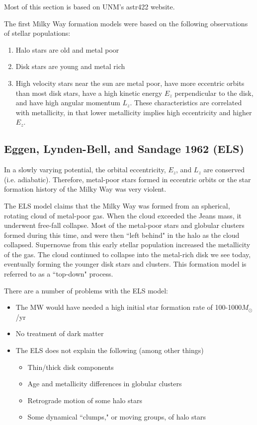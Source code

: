 Most of this section is based on UNM's astr422 website.

The first Milky Way formation models were based on the following observations of stellar populations:

\begin{enumerate}
\item Halo stars are old and metal poor
\item Disk stars are young and metal rich
\item High velocity stars near the sun are metal poor, have more eccentric orbits than most disk stars, have a high kinetic energy $E_z$ perpendicular to the disk, and have high angular momentum $L_z$. These characteristics are correlated with metallicity, in that lower metallicity implies high eccentricity and higher $E_z$. 
\end{enumerate}

\subsection{Eggen, Lynden-Bell, and Sandage 1962 (ELS)}

In a slowly varying potential, the orbital eccentricity, $E_z$, and $L_z$ are conserved (i.e. adiabatic). Therefore, metal-poor stars formed in eccentric orbits or the star formation history of the Milky Way was very violent. 

The ELS model claims that the Milky Way was formed from an spherical, rotating cloud of metal-poor gas. When the cloud exceeded the Jeans mass, it underwent free-fall collapse. Most of the metal-poor stars and globular clusters formed during this time, and were then ``left behind" in the halo as the cloud collapsed. Supernovae from this early stellar population increased the metallicity of the gas. The cloud continued to collapse into the metal-rich disk we see today, eventually forming the younger disk stars and clusters. This formation model is referred to as a ``top-down" process.

There are a number of problems with the ELS model:
\begin{itemize}
\item The MW would have needed a high initial star formation rate of 100-1000$M_\odot$/yr
\item No treatment of dark matter
\item The ELS does not explain the following (among other things)

\begin{itemize}
\item Thin/thick disk components
\item Age and metallicity differences in globular clusters
\item Retrograde motion of some halo stars
\item Some dynamical ``clumps," or moving groups, of halo stars
\end{itemize}

\end{itemize}

